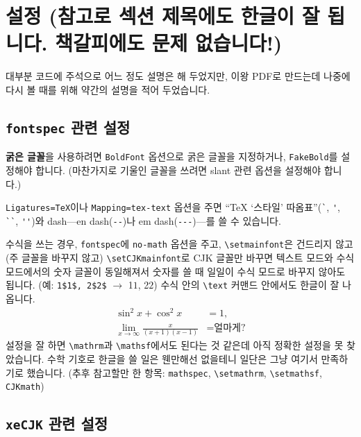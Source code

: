\documentclass[a4paper]{article}
\numberwithin{equation}{section}
\begin{document}
\section{설정 (참고로 섹션 제목에도 한글이 잘 됩니다.
책갈피에도 문제 없습니다!)}

대부분 코드에 주석으로 어느 정도 설명은 해 두었지만, 이왕 PDF로 만드는데 나중에 다시 볼 때를 위해 약간의 설명을 적어 두었습니다.



\subsection{\texttt{fontspec} 관련 설정}

\textbf{굵은 글꼴}을 사용하려면 \texttt{BoldFont} 옵션으로 굵은 글꼴을 지정하거나, \texttt{FakeBold}를 설정해야 합니다. (마찬가지로 기울인 글꼴을 쓰려면 slant 관련 옵션을 설정해야 합니다.)

\texttt{Ligatures=TeX}이나 \texttt{Mapping=tex-text} 옵션을 주면 ``\TeX{} `스타일' 따옴표''(\verb+`+, \verb+'+, \verb+``+, \verb+''+)와 dash---en dash(\verb+--+)나 em dash(\verb+---+)---를 쓸 수 있습니다.

수식을 쓰는 경우, \texttt{fontspec}에 \texttt{no-math} 옵션을 주고, \verb+\setmainfont+은 건드리지 않고(주 글꼴을 바꾸지 않고) \verb+\setCJKmainfont+로 CJK 글꼴만 바꾸면 텍스트 모드와 수식 모드에서의 숫자 글꼴이 동일해져서 숫자를 쓸 때 일일이 수식 모드로 바꾸지 않아도 됩니다.
(예: \verb+1$1$, 2$2$+ $\to$ 1$1$, 2$2$) 수식 안의 \verb+\text+ 커맨드 안에서도 한글이 잘 나옵니다.
\begin{align}
  \sin^2 x + \cos^2 x &= 1,
  \\
  \lim_{x \to \infty} \frac{x}{(x+1)(x-1)} &= \text{얼마게?}
\end{align}
설정을 잘 하면 \verb+\mathrm+과 \verb+\mathsf+에서도 된다는 것 같은데 아직 정확한 설정을 못 찾았습니다.
수학 기호로 한글을 쓸 일은 웬만해선 없을테니 일단은 그냥 여기서 만족하기로 했습니다.
(추후 참고할만 한 항목: \texttt{mathspec}, \verb+\setmathrm+, \verb+\setmathsf+, \texttt{CJKmath})

\subsection{\texttt{xeCJK} 관련 설정}
\end{document}
